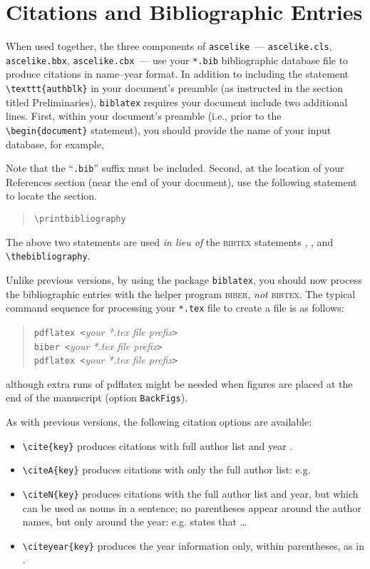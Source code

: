 \documentclass[Proceedings]{ascelike}
\begin{document}
\section{Citations and Bibliographic Entries}\label{sec:bibliogrphy}
When used together, the three components
of \texttt{ascelike}~--- \texttt{ascelike.cls}, \texttt{ascelike.bbx},
\texttt{ascelike.cbx}~---
use your \texttt{*.bib} bibliographic database file to
produce citations in name--year format.
In addition to including the statement
\verb+\texttt{authblk}+ in your document's preamble
(as instructed in the section titled Preliminaries),
\texttt{biblatex}
requires your document include two additional lines.
First, within your document's preamble
(i.e., prior to the \verb+\begin{document}+ statement),
you should provide the name of your input database, for example,
%
\begin{quote}
  \verb++
\end{quote}
%
Note that the ``\texttt{.bib}'' suffix must be included.
Second, at the location of your References section
(near the end of your document),
use the following statement to locate the section.
%
\begin{quote}
  \verb+\printbibliography+
\end{quote}
%
The above two statements are used \emph{in lieu of} the \textsc{bibtex}
statements \verb++,
\verb++, and \verb+\thebibliography+.
%
\par
Unlike previous versions, by using the package \texttt{biblatex},
you should now process the bibliographic
entries with the helper program \textsc{biber}, \emph{not} \textsc{bibtex}.
The typical command sequence for processing your \texttt{*.tex} file 
to create a  file is as follows:
%
  \begin{quote}
    \verb+pdflatex <+\emph{your *.tex file prefix}\verb+>+\\
    \verb+biber <+\emph{your *.tex file prefix}\verb+>+\\
    \verb+pdflatex <+\emph{your *.tex file prefix}\verb+>+
  \end{quote}
%
although extra runs of \textsf{pdflatex} might be needed when figures
are placed at the end of the manuscript
(option \texttt{BackFigs}).
%
\par
As with previous versions,
the following citation options are available:
\begin{itemize}
\item
\verb+\cite{key}+ produces citations with full author 
list and year \cite{Ireland:1954a,Gaspar:2001a}.
\item
\verb+\citeA{key}+ produces citations with only the full 
author list: e.g. 
\item
\verb+\citeN{key}+ produces citations with the full author list and year, but
which can be used as nouns in a sentence; no parentheses appear around
the author names, but only around the year: e.g. 
states that \ldots
\item
\verb+\citeyear{key}+ produces the year information only, within parentheses,
as in \citeyear{Ireland:1954a}.
\end{itemize}
\end{document}

